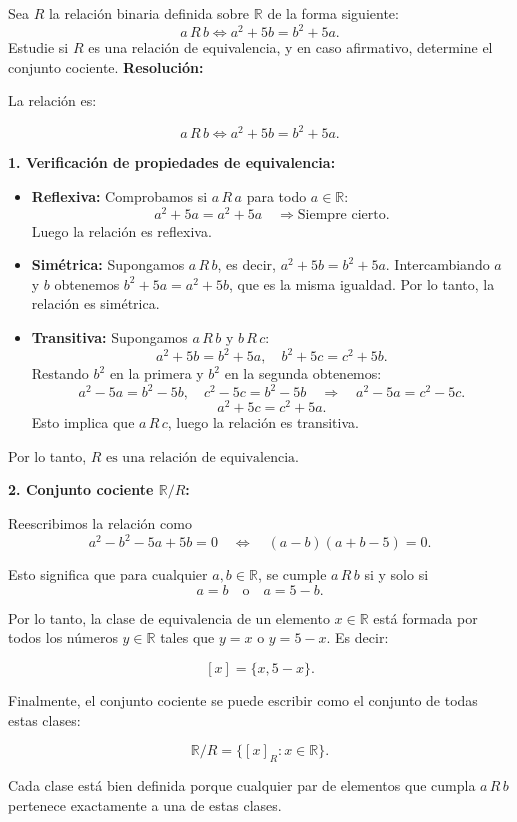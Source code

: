 \documentclass[a4paper,12pt]{article}
\begin{document}
\begin{ejercicio}[title=Ejercicio 13]
Sea $R$ la relación binaria definida sobre $\mathbb{R}$ de la forma siguiente:
\[
a\,R\,b \iff a^2 + 5b = b^2 + 5a.
\]
Estudie si $R$ es una relación de equivalencia, y en caso afirmativo, determine el conjunto cociente.
\tcblower
\textbf{Resolución:}

La relación es:

\[
a\,R\,b \iff a^2 + 5b = b^2 + 5a.
\]

\textbf{1. Verificación de propiedades de equivalencia:}

\begin{itemize}
\item \textbf{Reflexiva:}  
Comprobamos si $a\,R\,a$ para todo $a \in \mathbb{R}$:  
\[
a^2 + 5a = a^2 + 5a \quad \Rightarrow \text{Siempre cierto.}  
\]  
Luego la relación es reflexiva.

\item \textbf{Simétrica:}  
Supongamos $a\,R\,b$, es decir, $a^2 + 5b = b^2 + 5a$.  
Intercambiando $a$ y $b$ obtenemos $b^2 + 5a = a^2 + 5b$, que es la misma igualdad.  
Por lo tanto, la relación es simétrica.

\item \textbf{Transitiva:}  
Supongamos $a\,R\,b$ y $b\,R\,c$:  
\[
a^2 + 5b = b^2 + 5a, \quad b^2 + 5c = c^2 + 5b.
\]  
Restando $b^2$ en la primera y $b^2$ en la segunda obtenemos:  
\[
a^2 - 5a = b^2 - 5b, \quad c^2 - 5c = b^2 - 5b \quad \Rightarrow \quad a^2 - 5a = c^2 - 5c.
\]
\[
a^2 + 5c = c^2 + 5a.
\]  
Esto implica que $a\,R\,c$, luego la relación es transitiva.
\end{itemize}

Por lo tanto, \(\boxed{\text{$R$ es una relación de equivalencia.}}\)

\vspace{0.5em}

\textbf{2. Conjunto cociente $\mathbb{R}/R$:}  

Reescribimos la relación como
\[
a^2 - b^2 - 5a + 5b = 0 \quad \iff \quad (a-b)(a+b-5)=0.
\]

Esto significa que para cualquier $a,b \in \mathbb{R}$, se cumple $a\,R\,b$ si y solo si
\[
a = b \quad \text{o} \quad a = 5 - b.
\]

Por lo tanto, la clase de equivalencia de un elemento $x \in \mathbb{R}$ está formada por todos los números $y \in \mathbb{R}$ tales que $y = x$ o $y = 5-x$. Es decir:

\[
[x] = \{x, 5-x\}.
\]

\end{ejercicio}
\begin{ejercicio}[title=Ejercicio 13]

Finalmente, el conjunto cociente se puede escribir como el conjunto de todas estas clases:

\[
\boxed{\mathbb{R}/R = \{ [x]_R : x \in \mathbb{R} \}}.
\]

Cada clase está bien definida porque cualquier par de elementos que cumpla $a\,R\,b$ pertenece exactamente a una de estas clases.

\end{ejercicio}
\end{document}
